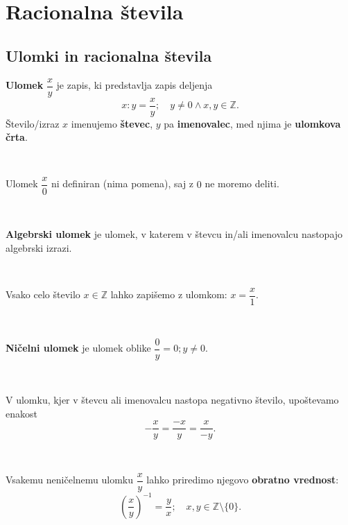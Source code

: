 \chapter{Racionalna števila}





    \section{Ulomki in racionalna števila}

        
            
                \textbf{Ulomek} $\dfrac{x}{y}$ je zapis, ki predstavlja zapis deljenja 
                $$x:y=\dfrac{x}{y};\quad y\neq 0\land x,y\in\mathbb{Z}.$$
                Število/izraz $x$ imenujemo \textbf{števec}, $y$ pa \textbf{imenovalec}, med njima je \textbf{ulomkova črta}.
            
                ~
            
                Ulomek $\dfrac{x}{0}$ ni definiran (nima pomena), saj z $0$ ne moremo deliti.
            
                ~
            
                \textbf{Algebrski ulomek} je ulomek, v katerem v števcu in/ali imenovalcu nastopajo algebrski izrazi.
            
                ~
            
                Vsako celo število $x\in\mathbb{Z}$ lahko zapišemo z ulomkom: $x=\dfrac{x}{1}$.
            
                ~
            
                \textbf{Ničelni ulomek} je ulomek oblike $\dfrac{0}{y}=0; y\neq 0$.
            
                ~
            
                V ulomku, kjer v števcu ali imenovalcu nastopa negativno število, upoštevamo enakost 
                $$-\dfrac{x}{y}=\dfrac{-x}{y}=\dfrac{x}{-y}.$$
            
                ~
            
                Vsakemu neničelnemu ulomku $\dfrac{x}{y}$ lahko priredimo njegovo \textbf{obratno vrednost}:
                $$\left(\dfrac{x}{y}\right)^{-1}=\dfrac{y}{x}; \quad x,y\in\mathbb{Z}\setminus\{0\}.$$
            

        


        
